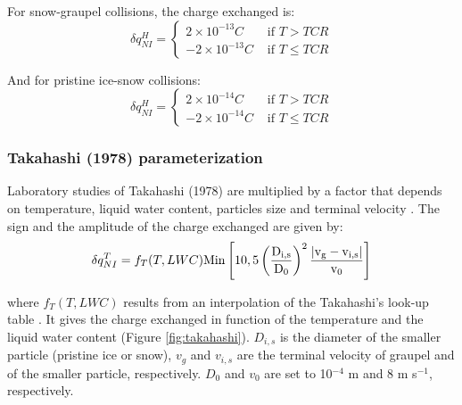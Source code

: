\noindent
For snow-graupel collisions, the charge exchanged is:
\begin{equation}
  \delta q_{NI} ^{H} = \left\{
  \begin{array}{rl}
    2 \times 10^{-13} C & \mbox{ if } T > TCR \\
    -2 \times 10^{-13} C & \mbox{ if } T \leq TCR
  \end{array}
  \right.
\end{equation}

\noindent
And for pristine ice-snow collisions:
\begin{equation}
  \delta q_{NI} ^{H} = \left\{
  \begin{array}{rl}
    2 \times 10^{-14} C & \mbox{ if } T > TCR \\
    -2 \times 10^{-14} C & \mbox{ if } T \leq TCR
  \end{array}
\right.
\end{equation}

\subsubsection{Takahashi (1978) parameterization}

Laboratory studies of Takahashi (1978) are multiplied by a factor that depends on temperature, liquid water content, particles size and terminal velocity \citep{Takahashi-1984}.
The sign and the amplitude of the charge exchanged are given by:
\begin{equation}
  \delta q_{NI} ^{T} = f_T (T,LWC) \rm{Min} \left[ 10, 5 \left( \frac{D_{i,s}} {D_0} \right) ^2 \frac{|v_g - v_{i,s}|} {v_0} \right]
\label{eq:takah}
\end{equation}

\noindent
where $f_T (T,LWC)$ results from an interpolation of the Takahashi's look-up table \citep{Wojcik-1994,Mansell-2000}.
It gives the charge exchanged in function of the temperature and the liquid water content (Figure \ref{fig:takahashi}).
$D_{i,s}$ is the diameter of the smaller particle (pristine ice or snow), $v_g$ and $v_{i,s}$ are the terminal velocity of graupel and of the smaller particle, respectively.
$D_0$ and $v_0$ are set to 10$^{-4}$ m and 8 m s$^{-1}$, respectively.

